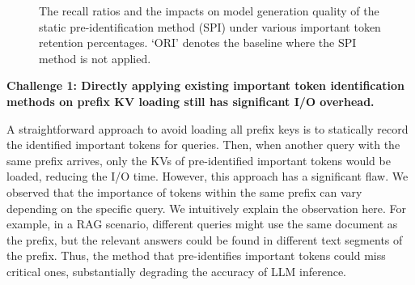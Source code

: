 \label{motiv}

\begin{figure}
	\centering
	\hspace{0.06in}
	\caption{The recall ratios and the impacts on model generation quality of the static pre-identification method (SPI) under various important token retention percentages. `ORI' denotes the baseline where the SPI method is not applied.}
	\label{fig:static_methods}
\end{figure}


\noindent \textbf{Challenge 1: Directly applying existing important token identification methods on prefix KV loading still has significant I/O overhead.}

A straightforward approach to avoid loading all prefix keys is to statically record the identified important tokens for queries. Then, when another query with the same prefix arrives, only the KVs of pre-identified important tokens would be loaded, reducing the I/O time.
However, this approach has a significant flaw. We observed that the importance
of tokens within the same prefix can vary depending on the specific query. We
intuitively explain the observation here. For example, in a RAG scenario,
different queries might use the same document as the prefix, but the relevant
answers could be found in different text segments of the prefix. 
Thus, the method that pre-identifies important tokens could miss critical ones, substantially degrading the accuracy of LLM inference.

